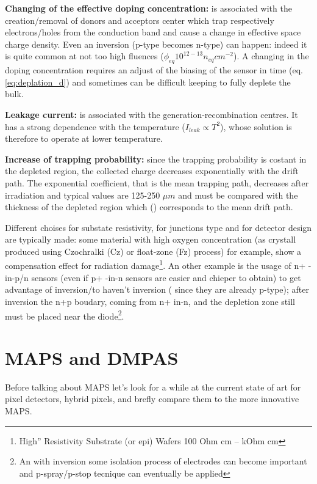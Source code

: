 \textbf{Changing of the effective doping concentration:} is associated with the creation/removal of donors and acceptors center which trap respectively electrons/holes from the conduction band and cause a change in effective space charge density. Even an inversion (p-type becomes n-type) can happen: indeed it is quite common at not too high fluences ($\phi_{eq} 10^{12-13}n_{eq}cm^{-2}$). 
A changing in the doping concentration requires an adjust of the biasing of the sensor in time (eq.\ref{eq:deplation_d}) and sometimes can be difficult keeping to fully deplete the bulk.

\textbf{Leakage current:} is associated with the generation-recombination centres. It has a strong dependence with the temperature ($I_{leak}\propto T^2$), whose solution is therefore to operate at lower temperature.

\textbf{Increase of trapping probability:} since the trapping probability is costant in the depleted region, the collected charge decreases exponentially with the drift path. The exponential coefficient, that is the mean trapping path, decreases after irradiation and typical values are 125-250 $\mu m$ and must be compared with the thickness of the depleted region which () corresponds to the mean drift path.

Different choises for substate resistivity, for junctions type and for detector design are typically made: some material with high oxygen concentration (as crystall produced using Czochralki (Cz) or float-zone (Fz) process) for example, show a compensation effect for radiation damage\footnote{High” Resistivity Substrate (or epi)
Wafers 100 Ohm cm – kOhm cm}. An other example is the usage of n+ -in-p/n sensors (even if p+ -in-n sensors are easier and chieper to obtain) to get advantage of inversion/to haven't inversion ( since they are already p-type); after inversion the n+p boudary, coming from n+ in-n, and the depletion zone still must be placed near the diode\footnote{An with inversion some isolation process of electrodes can become important and p-spray/p-stop tecnique can eventually be applied}.

\section{MAPS and DMPAS}
Before talking about MAPS let's look for a while at the current state of art for pixel detectors, hybrid pixels, and brefly compare them to the more innovative MAPS.

